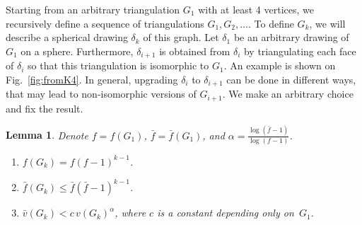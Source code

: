 \documentclass[reqno,12pt]{amsart}
\newcommand{\lin}[1]{\bar v(#1)}
\newcommand{\cut}[1]{\bar f(#1)}
\newcommand{\ff}{{\bar f}}
\newtheorem{lemma}[theorem]{Lemma}
\newenvironment{bfenumerate}{\renewcommand{\labelenumi}{{\bf\theenumi.}}\renewcommand{\labelenumii}{{\bf(\theenumii)}}\begin{enumerate}}{\end{enumerate}}
\begin{document}
Starting from an arbitrary triangulation $G_1$ with at least 4 vertices, 
we recursively define 
a sequence of triangulations $G_1,G_2,\ldots$. To define $G_k$, we will
describe a spherical drawing $\delta_k$ of this graph. Let $\delta_1$ be
an arbitrary drawing of $G_1$ on a sphere. Furthermore, $\delta_{i+1}$
is obtained from $\delta_i$ by triangulating each face of $\delta_i$ so
that this triangulation is isomorphic to $G_1$. An example is shown
on Fig.~\ref{fig:fromK4}. In general, upgrading $\delta_i$ to $\delta_{i+1}$
can be done in different ways, that may lead to non-isomorphic versions
of $G_{i+1}$. We make an arbitrary choice and fix the result.


\begin{lemma}\label{lem:Gk}
Denote $f=f(G_1)$, $\ff=\cut{G_1}$, and $\alpha=\displaystyle\frac{\log(\ff-1)}{\log(f-1)}$.
\begin{bfenumerate}
\item
$f(G_k)=f(f-1)^{k-1}$.
\item
$\cut{G_k}\le\ff(\ff-1)^{k-1}$.
\item
$\lin{G_k}<c\,v(G_k)^\alpha$, where $c$ is a constant depending only on~$G_1$.
\end{bfenumerate}
\end{lemma}
\end{document}
